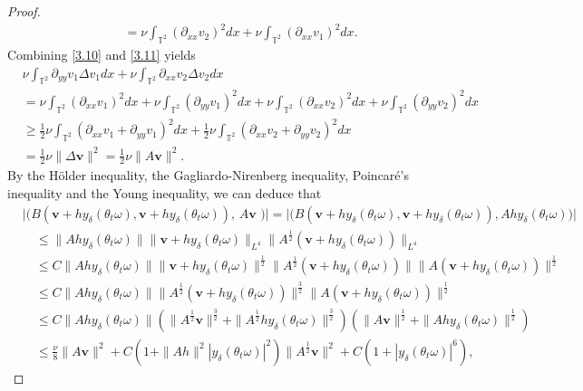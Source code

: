 \documentclass{elsarticle}
\theoremstyle{definition}
\numberwithin{equation}{section}
\begin{document}
\begin{proof}
\begin{align}
&=\nu \int_{\mathbb{T}^2}(\partial_{xx}v_2)^2dx
+\nu \int_{\mathbb{T}^2}(\partial_{xx}v_1)^2dx.
\end{align}
Combining \eqref{3.10} and \eqref{3.11} yields
\begin{align}\label{3.12}
&\nu \int_{\mathbb{T}^2}\partial_{yy}v_1\Delta v_1dx+\nu \int_{\mathbb{T}^2}\partial_{xx}v_2\Delta v_2dx\nonumber\\
&=\nu \int_{\mathbb{T}^2}(\partial_{xx}v_1)^2dx+\nu \int_{\mathbb{T}^2}(\partial_{yy}v_1)^2dx
+\nu \int_{\mathbb{T}^2}(\partial_{xx}v_2)^2dx+\nu \int_{\mathbb{T}^2}(\partial_{yy}v_2)^2dx\nonumber\\
&\geq \frac12\nu \int_{\mathbb{T}^2}(\partial_{xx}v_1+\partial_{yy}v_1)^2dx
+\frac12\nu \int_{\mathbb{T}^2}(\partial_{xx}v_2+\partial_{yy}v_2)^2dx
\nonumber\\
&=\frac12\nu\|\Delta \textbf{v}\|^2=\frac12\nu\|A \textbf{v}\|^2.
\end{align}
By the H\"{o}lder inequality,  the Gagliardo-Nirenberg inequality, Poincar\'{e}'s inequality and the Young inequality, we can deduce that
\begin{align}\label{4.4}
&\big| \big(B(\textbf{v}+hy_{\delta}(\theta_t\omega),\textbf{v}+hy_{\delta}(\theta_t\omega)),\, A\textbf{v }\big)\big|
= \big| \big(B(\textbf{v}+hy_{\delta}(\theta_t\omega),\textbf{v}+hy_{\delta}(\theta_t\omega)),Ahy_{\delta}(\theta_t\omega) \big) \big| \nonumber\\
& \quad \leq \|Ahy_{\delta}(\theta_t\omega)\|\|\textbf{v}+hy_{\delta}(\theta_t\omega)\|_{L^4}\|A^{\frac12}(\textbf{v}+hy_{\delta}(\theta_t\omega))
\|_{L^4}\nonumber\\
& \quad \leq C\|Ahy_{\delta}(\theta_t\omega)\|\|\textbf{v}+hy_{\delta}(\theta_t\omega)\|^{\frac12}
\|A^{\frac12}(\textbf{v}+hy_{\delta}(\theta_t\omega))\|
\|A(\textbf{v}+hy_{\delta}(\theta_t\omega))\|^{\frac12}\nonumber\\
& \quad \leq C\|Ahy_{\delta}(\theta_t\omega)\|\|A^{\frac12}(\textbf{v}+hy_{\delta}(\theta_t\omega))\|^{\frac32}
\|A(\textbf{v}+hy_{\delta}(\theta_t\omega))\|^{\frac12}\nonumber\\
& \quad \leq  C\|Ahy_{\delta}(\theta_t\omega)\| \left (\|A^{\frac12}\textbf{v}\|^{\frac32}+\|A^{\frac12}hy_{\delta}(\theta_t\omega)\|^{\frac32}\right) \left
(\|A\textbf{v}\|^{\frac12}+\|Ahy_{\delta}(\theta_t\omega)\|^{\frac12} \right)\nonumber\\
& \quad \leq \frac  \nu 8\|A\textbf{v}\|^2+C\left (1+\|Ah\|^2|y_{\delta}(\theta_t\omega)|^2 \right )\|A^{\frac12}\textbf{v}\|^2+C\left (1+|y_{\delta}(\theta_t\omega)|^6\right),

\end{align}
\end{proof}
\end{document}
